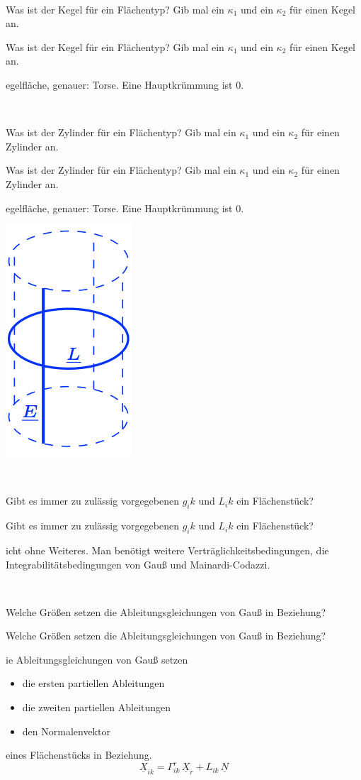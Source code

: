 \documentclass[DIV=1]{scrartcl}
\newcommand{\frage}[3][10]{
    \newpage
    \ 
    \vspace{#1 em}
    \begin{framed}
        #2
    \end{framed}
    \newpage
    \begin{framed}
        #2
    \end{framed}
    \vspace{2 em}
}
\begin{document}
\frage{Was ist der Kegel für ein Flächentyp? Gib mal ein $\kappa_1$ und ein $\kappa_2$ für einen Kegel an.}

Regelfläche, genauer: Torse. Eine Hauptkrümmung ist $0$.



\frage{Was ist der Zylinder für ein Flächentyp? Gib mal ein $\kappa_1$ und ein $\kappa_2$ für einen Zylinder an.}

Regelfläche, genauer: Torse. Eine Hauptkrümmung ist $0$.
\\
\begin{center}
    \includegraphics[scale=1]{zylinder.png}
\end{center}














\frage{Gibt es immer zu zulässig vorgegebenen $g_ik$ und $L_ik$ ein Flächenstück?}

Nicht ohne Weiteres. Man benötigt weitere Verträglichkeitsbedingungen, die Integrabilitätsbedingungen von Gauß und Mainardi-Codazzi.



\frage{Welche Größen setzen die Ableitungsgleichungen von Gauß in Beziehung?}

Die Ableitungsgleichungen von Gauß setzen
\begin{itemize}
    \item die ersten partiellen Ableitungen
    \item die zweiten partiellen Ableitungen 
    \item den Normalenvektor
\end{itemize}
eines Flächenstücks in Beziehung.
\[
    \underline{X}_{ik} = \Gamma_{ik}^r \, \underline{X}_r + L_{ik} \, \underline{N}
\]
\end{document}
